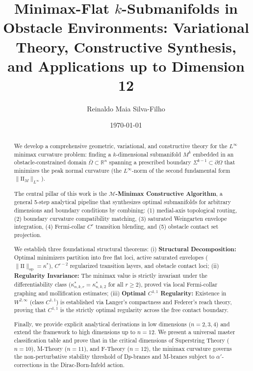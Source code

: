 \documentclass[11pt,reqno]{amsart}
\theoremstyle{definition}
\providecommand{\R}{\mathbb{R}}
\providecommand{\II}{\mathrm{I\!I}}
\newcommand{\op}{\mathrm{op}}
\numberwithin{equation}{section}
\providecommand{\II}{\mathrm{II}}
\providecommand{\R}{\mathbb{R}}
\begin{document}
\title[Minimax-Flat \texorpdfstring{$k$}{k}-Submanifolds in Obstacle Environments]{Minimax-Flat \texorpdfstring{$k$}{k}-Submanifolds in Obstacle Environments: Variational Theory, Constructive Synthesis, and Applications up to Dimension 12}

\author{Reinaldo Maia Silva-Filho}
\address{Programa de P\'os-Gradua\c{c}\~ao em Estat\'istica e Experimenta\c{c}\~ao Agropecu\'aria (PPGEEAA/DES), Universidade Federal de Lavras (UFLA)}

\date{\today}

\begin{abstract}
We develop a comprehensive geometric, variational, and constructive theory for the $L^\infty$ minimax curvature problem: finding a $k$-dimensional submanifold $M^k$ embedded in an obstacle-constrained domain $\bar{\Omega} \subset \R^n$ spanning a prescribed boundary $\Sigma^{k-1} \subset \partial\Omega$ that minimizes the peak normal curvature (the $L^\infty$-norm of the second fundamental form $\|\II_M\|_{L^\infty}$).

The central pillar of this work is the \textbf{$\mathcal{M}$-Minimax Constructive Algorithm}, a general 5-step analytical pipeline that synthesizes optimal submanifolds for arbitrary dimensions and boundary conditions by combining: (1) medial-axis topological routing, (2) boundary curvature compatibility matching, (3) saturated Weingarten envelope integration, (4) Fermi-collar $C^r$ transition blending, and (5) obstacle contact set projection.

We establish three foundational structural theorems:
(i) \textbf{Structural Decomposition:} Optimal minimizers partition into free flat loci, active saturated envelopes ($\|\II\|_{\op} = \kappa^*$), $C^{r-2}$ regularized transition layers, and obstacle contact loci;
(ii) \textbf{Regularity Invariance:} The minimax value is strictly invariant under the differentiability class ($\kappa^*_{n,k,r} = \kappa^*_{n,k,2}$ for all $r \ge 2$), proved via local Fermi-collar graphing and mollification estimates;
(iii) \textbf{Optimal $C^{1,1}$ Regularity:} Existence in $W^{2,\infty}$ (class $C^{1,1}$) is established via Langer's compactness and Federer's reach theory, proving that $C^{1,1}$ is the strictly optimal regularity across the free contact boundary.

Finally, we provide explicit analytical derivations in low dimensions ($n=2,3,4$) and extend the framework to high dimensions up to $n=12$. We present a universal master classification table and prove that in the critical dimensions of Superstring Theory ($n=10$), M-Theory ($n=11$), and F-Theory ($n=12$), the minimax curvature governs the non-perturbative stability threshold of D$p$-branes and M-branes subject to $\alpha'$-corrections in the Dirac-Born-Infeld action.
\end{abstract}
\end{document}
